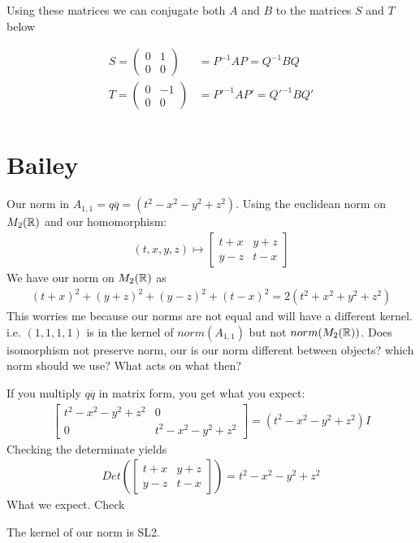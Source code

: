 \documentclass{article}
\begin{document}
Using these matrices we can conjugate both $A$ and $B$ to the matrices $S$ and $T$ below

\begin{align*}
    S = \left(\begin{matrix}
        0 & 1\\
        0 & 0 
    \end{matrix}\right) &= P^{-1}AP = Q^{-1}BQ \\
    T = \left(\begin{matrix}
        0 & -1\\
        0 &  0 
    \end{matrix}\right) &= P'^{-1}AP' = Q'^{-1}BQ' \\
\end{align*}

\section{Bailey}
Our norm in $A_{1,1} = q\overline{q} = (t^2 - x^2 - y^2 + z^2)$. Using the euclidean norm on $M_2(\protect\mathbb{R})$ and our homomorphism:
\begin{gather}
    (t,x,y,z) \mapsto  \begin{bmatrix} 
    t + x & y + z \\
    y-z & t-x 
    \end{bmatrix}
\end{gather}
We have our norm on $M_2(\protect\mathbb{R})$ as 
\begin{gather*}
    (t+x)^2 + (y+z)^2 + (y-z)^2 + (t-x)^2 = 2(t^2 + x^2 + y^2 + z^2)
\end{gather*}
This worries me because our norms are not equal and will have a different kernel. i.e. $(1,1,1,1)$ is in the kernel of $norm(A_{1,1})$ but not $norm(M_2(\protect\mathbb{R}))$. Does isomorphism not preserve norm, our is our norm different between objects? which norm should we use? What acts on what then?

If you multiply $q\overline{q}$ in matrix form, you get what you expect:
\begin{gather*}
    \begin{bmatrix}
        t^2 -x^2-y^2+z^2 & 0 \\ 
        0 & t^2 -x^2 -y^2 + z^2
    \end{bmatrix} = (t^2 - x^2 - y^2 + z^2)I
\end{gather*}
Checking the determinate yields 
\begin{gather*}
    Det(\begin{bmatrix} 
        t+x & y+z \\
        y-z & t-x
    \end{bmatrix}) = t^2 - x^2 - y^2 + z^2
\end{gather*}
What we expect. Check

The kernel of our norm is SL2.
\end{document}
